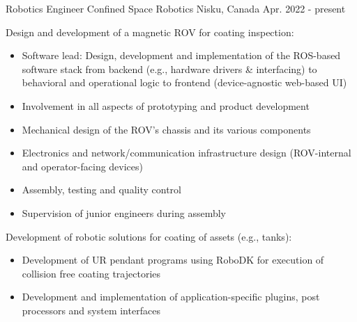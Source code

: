 

\begin{cventries}

  \cventry
    {Robotics Engineer}
    {Confined Space Robotics}
    {Nisku, Canada}
    {Apr. 2022 - present}
    {
      \begin{cvitems}
        \item Design and development of a magnetic ROV for coating inspection:
        \begin{itemize}
          \item Software lead: Design, development and implementation of the ROS-based software stack from backend (e.g., hardware drivers \& interfacing) to behavioral and operational logic to frontend (device-agnostic web-based UI)
          \item Involvement in all aspects of prototyping and product development
          \item Mechanical design of the ROV's chassis and its various components
          \item Electronics and network/communication infrastructure design (ROV-internal and operator-facing devices)
          \item Assembly, testing and quality control
          \item Supervision of junior engineers during assembly
        \end{itemize}
        \item Development of robotic solutions for coating of assets (e.g., tanks):
        \begin{itemize}
          \item Development of UR pendant programs using RoboDK for execution of collision free coating trajectories
          \item Development and implementation of application-specific plugins, post processors and system interfaces
        \end{itemize}
      \end{cvitems}
    }


\end{cventries}

